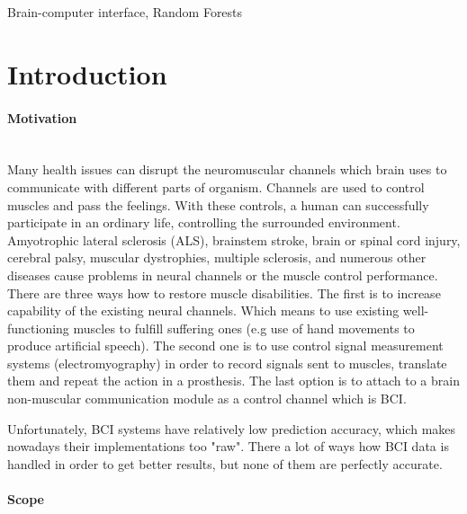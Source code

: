 \documentclass[12pt]{article}
\newcommand{\TODO}{\todo[inline]}
\begin{document}
\vspace*{3ex}
{}
Brain-computer interface, Random Forests
\vspace*{3ex}



\newpage
\tableofcontents

\newpage
\section{Introduction}
\paragraph{Motivation}~\\

Many health issues can disrupt the neuromuscular channels which brain uses to communicate with different parts of organism. Channels are used to control muscles and pass the feelings. With these controls, a human can successfully participate in an ordinary life, controlling the surrounded environment. Amyotrophic lateral sclerosis (ALS), brainstem stroke, brain or spinal cord injury, cerebral palsy, muscular dystrophies, multiple sclerosis, and numerous other diseases cause problems in neural channels or the muscle control performance. There are three ways how to restore muscle disabilities. The first is to increase capability of the existing neural channels. Which means to use existing well-functioning muscles to fulfill suffering ones (e.g use of hand movements to produce artificial speech). The second one is to use control signal measurement systems (electromyography) in order to record signals sent to muscles, translate them and repeat the action in a prosthesis. The last option is to attach to a brain non-muscular communication module as a control channel which is BCI.\cite{bci_jonathan}

Unfortunately, BCI systems have relatively low prediction accuracy, which makes nowadays their implementations too "raw". There a lot of ways how BCI data is handled in order to get better results, but none of them are perfectly accurate.
\paragraph{Scope}~\\
\end{document}
